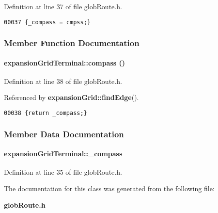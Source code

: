 Definition at line 37 of file glob\-Route.h.\small\begin{verbatim}00037 {_compass = cmpss;}
\end{verbatim}\normalsize 


\subsubsection{Member Function Documentation}
\label{expansionGridTerminal_a1}
\paragraph{ expansion\-Grid\-Terminal::compass ()\hspace{0.3cm}{\tt  [inline]}}\hfill



Definition at line 38 of file glob\-Route.h.

Referenced by {\bf expansion\-Grid::find\-Edge}().\small\begin{verbatim}00038 {return _compass;}
\end{verbatim}\normalsize 


\subsubsection{Member Data Documentation}
\label{expansionGridTerminal_o0}
\paragraph{ expansion\-Grid\-Terminal::\_\-compass\hspace{0.3cm}{\tt  [private]}}\hfill



Definition at line 35 of file glob\-Route.h.

The documentation for this class was generated from the following file:\begin{CompactItemize}
\item 
{\bf glob\-Route.h}\end{CompactItemize}
